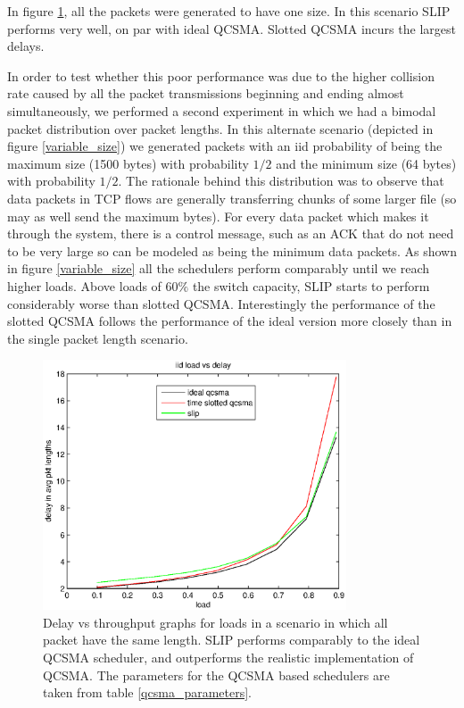 \documentclass[11pt]{article}%
\begin{document}
In figure \ref{one_size}, all the packets were generated to have one size.  In this scenario SLIP performs very well, on par with ideal QCSMA.  Slotted QCSMA incurs the largest delays.

In order to test whether this poor performance was due to the higher collision rate caused by all the packet transmissions beginning and ending almost simultaneously, we performed a second experiment in which we had a bimodal packet distribution over packet lengths.  In this alternate scenario (depicted in figure \ref{variable_size}) we generated packets with an iid probability of being the maximum size (1500 bytes) with probability $1/2$ and the minimum size (64 bytes) with probability $1/2$.  The rationale behind this distribution was to observe that data packets in TCP flows are generally transferring chunks of some larger file (so may as well send the maximum bytes).  For every data packet which makes it through the system, there is a control message, such as an ACK that do not need to be very large so can be modeled as being the minimum data packets.  As shown in figure \ref{variable_size} all the schedulers perform comparably until we reach higher loads.  Above loads of $60\%$ the switch capacity, SLIP starts to perform considerably worse than slotted QCSMA.  Interestingly the performance of the slotted QCSMA follows the performance of the ideal version more closely than in the single packet length scenario.

\begin{figure}
\center
	 \includegraphics[width=90mm]{us_load.eps}
	\caption{Delay vs throughput graphs for loads in a scenario in which all packet have the same length.  SLIP performs comparably to the ideal QCSMA scheduler, and outperforms the realistic implementation of QCSMA.  The parameters for the QCSMA based schedulers are taken from table \ref{qcsma_parameters}.} 	
	\label{one_size}
\end{figure}
\end{document}
